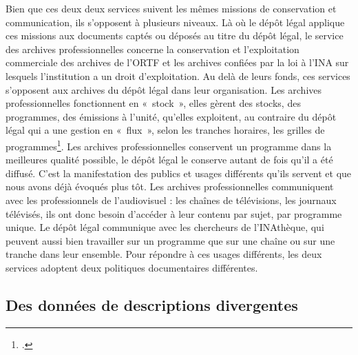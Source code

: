
Bien que ces deux deux services suivent les mêmes missions de conservation et communication, ils s'opposent à plusieurs niveaux. Là où le dépôt légal applique ces missions aux documents captés ou déposés au titre du dépôt légal, le service des archives professionnelles concerne la conservation et l’exploitation commerciale des archives de l’ORTF et les archives confiées par la loi à l’INA sur lesquels l’institution a un droit d’exploitation. Au delà de leurs fonds, ces services s'opposent aux archives du dépôt légal dans leur organisation. Les archives professionnelles fonctionnent en « stock », elles gèrent des stocks, des programmes, des émissions à l’unité, qu’elles exploitent, au contraire du dépôt légal qui a une gestion en « flux », selon les tranches horaires, les grilles de programmes\footcite[][23]{varra2023}. Les archives professionnelles conservent un programme dans la meilleures qualité possible, le dépôt légal le conserve autant de fois qu'il a été diffusé. C'est la manifestation des publics et usages différents qu'ils servent et que nous avons déjà évoqués plus tôt. Les archives professionnelles communiquent avec les professionnels de l’audiovisuel : les chaînes de télévisions, les journaux télévisés, ils ont donc besoin d'accéder à leur contenu par sujet, par programme unique. Le dépôt légal communique avec les chercheurs de l'INAthèque, qui peuvent aussi bien travailler sur un programme que sur une chaîne ou sur une tranche dans leur ensemble. Pour répondre à ces usages différents, les deux services adoptent deux politiques documentaires différentes. 

\subsection{Des données de descriptions divergentes}

